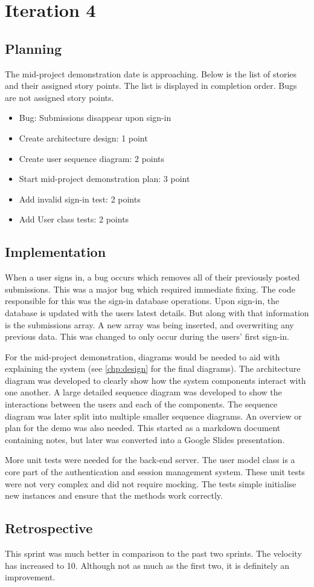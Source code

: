 \chapter{Iteration 4}
\section{Planning}
The mid-project demonstration date is approaching. Below is the list of stories and their assigned story points. The list is displayed in completion order. Bugs are not assigned story points.

\begin{itemize}
\item Bug: Submissions disappear upon sign-in
\item Create architecture design: 1 point
\item Create user sequence diagram: 2 points
\item Start mid-project demonstration plan: 3 point
\item Add invalid sign-in test: 2 points
\item Add User class tests: 2 points
\end{itemize}

\section{Implementation}
When a user signs in, a bug occurs which removes all of their previously posted submissions. This was a major bug which required immediate fixing. The code responsible for this was the sign-in database operations. Upon sign-in, the database is updated with the users latest details. But along with that information is the submissions array. A new array was being inserted, and overwriting any previous data. This was changed to only occur during the users' first sign-in.

For the mid-project demonstration, diagrams would be needed to aid with explaining the system (see \autoref{chp:design} for the final diagrams). The architecture diagram was developed to clearly show how the system components interact with one another. A large detailed sequence diagram was developed to show the interactions between the users and each of the components. The sequence diagram was later split into multiple smaller sequence diagrams. An overview or plan for the demo was also needed. This started as a markdown document containing notes, but later was converted into a Google Slides presentation.

More unit tests were needed for the back-end server. The user model class is a core part of the authentication and session management system. These unit tests were not very complex and did not require mocking. The tests simple initialise new instances and ensure that the methods work correctly.

\section{Retrospective}
This sprint was much better in comparison to the past two sprints. The velocity has increased to 10. Although not as much as the first two, it is definitely an improvement.
